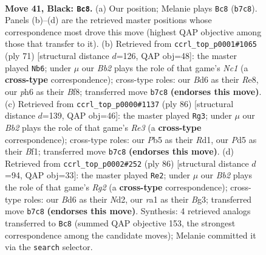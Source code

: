 \documentclass[11pt]{article}
\begin{document}
\clearpage

\begin{figure}[p]\centering
\begin{subfigure}{0.46\textwidth}\centering
\resizebox{\linewidth}{!}{%
\newchessgame
\chessboard[
  setfen={7r/pb1r1k1p/nq1b2pP/1p1p1pP1/3P1P2/1P2P2K/4N3/R2Q1BNR b - - 29 41},
  showmover=false,
  pgfstyle=straightmove, color=movearrow, markmove={b7-c8}
]}
\caption{}
\end{subfigure}\hfill
\begin{subfigure}{0.46\textwidth}\centering
\resizebox{\linewidth}{!}{%
\newchessgame
\chessboard[
  setfen={2n1rbk1/p2q1b1p/2p3p1/5pP1/2pP1B1P/2P1NP2/P2R2N1/3Q2K1 b - - 4 36},
  showmover=false,
  pgfstyle=straightmove, color=movearrow, markmove={c8-b6}
]}
\caption{}
\end{subfigure}
\\[4pt]
\begin{subfigure}{0.46\textwidth}\centering
\resizebox{\linewidth}{!}{%
\newchessgame
\chessboard[
  setfen={1r2q1k1/2r1bpp1/1p1ppnnp/8/1P1NP3/1Q2R2P/1B3PP1/3R1BK1 w - - 2 44},
  showmover=false,
  pgfstyle=straightmove, color=movearrow, markmove={e3-g3}
]}
\caption{}
\end{subfigure}\hfill
\begin{subfigure}{0.46\textwidth}\centering
\resizebox{\linewidth}{!}{%
\newchessgame
\chessboard[
  setfen={2n2r2/3bq2r/kp1np2p/p2p3P/P1pP2P1/2P1Q1BB/2PN2R1/R6K w - - 1 44},
  showmover=false,
  pgfstyle=straightmove, color=movearrow, markmove={g2-e2}
]}
\caption{}
\end{subfigure}
\caption{\textbf{Move 41, Black: \texttt{Bc8}.} (a) Our position; Melanie plays \texttt{Bc8} (\texttt{b7c8}). Panels (b)--(d) are the retrieved master positions whose correspondence most drove this move (highest QAP objective among those that transfer to it). (b) Retrieved from \texttt{ccrl\_top\_p0001\#1065} (ply 71) [structural distance $d$=126, QAP obj=48]: the master played \texttt{Nb6}; under $\mu$ our \emph{Bb2} plays the role of that game's \emph{Nc1} (a \textbf{cross-type} correspondence); cross-type roles: our \emph{B}d6 as their \emph{R}e8, our \emph{p}h6 as their \emph{B}f8; transferred move \texttt{b7c8} \textbf{(endorses this move)}. (c) Retrieved from \texttt{ccrl\_top\_p0000\#1137} (ply 86) [structural distance $d$=139, QAP obj=46]: the master played \texttt{Rg3}; under $\mu$ our \emph{Bb2} plays the role of that game's \emph{Re3} (a \textbf{cross-type} correspondence); cross-type roles: our \emph{P}b5 as their \emph{R}d1, our \emph{P}d5 as their \emph{B}f1; transferred move \texttt{b7c8} \textbf{(endorses this move)}. (d) Retrieved from \texttt{ccrl\_top\_p0002\#252} (ply 86) [structural distance $d$=94, QAP obj=33]: the master played \texttt{Re2}; under $\mu$ our \emph{Bb2} plays the role of that game's \emph{Rg2} (a \textbf{cross-type} correspondence); cross-type roles: our \emph{B}d6 as their \emph{N}d2, our \emph{r}a1 as their \emph{B}g3; transferred move \texttt{b7c8} \textbf{(endorses this move)}. Synthesis: 4 retrieved analogs transferred to \texttt{Bc8} (summed QAP objective 153, the strongest correspondence among the candidate moves); Melanie committed it via the \texttt{search} selector.}
\label{fig:thought-m81}
\end{figure}
\end{document}
